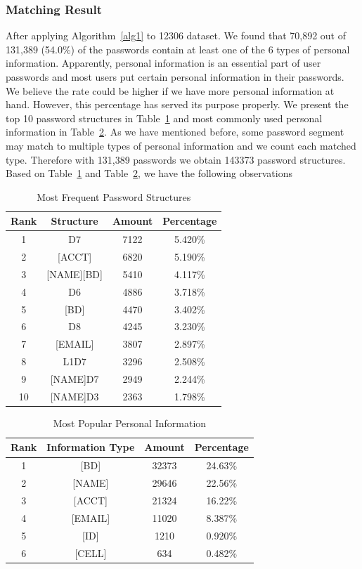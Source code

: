\documentclass{sig-alternate}
\begin{document}
\subsubsection{Matching Result}
\label{matchingresult}
After applying Algorithm~\ref{alg1} to 12306 dataset. We found that 70,892 out of 131,389 (54.0\%) of the passwords contain at least one of the 6 types of personal information. Apparently, personal information is an essential part of user passwords and most users put certain personal information in their passwords. We believe the rate could be higher if we have more personal information at hand. However, this percentage has served its purpose properly. We present the top 10 password structures in Table~\ref{t3} and most commonly used personal information in Table~\ref{t4}. As we have mentioned before, some password segment may match to multiple types of personal information and we count each matched type. Therefore with 131,389 passwords we obtain 143373 password structures. Based on Table~\ref{t3} and Table~\ref{t4}, we have the following observations

\begin{table}
\centering
\caption{Most Frequent Password Structures}
\begin{tabular}{|c|c|c|c|} \hline
Rank&Structure&Amount&Percentage\\ \hline
1&D7&7122&5.420\% \\
2&[ACCT]&6820&5.190\% \\
3&[NAME][BD]&5410&4.117\% \\
4&D6&4886&3.718\% \\
5&[BD]&4470&3.402\% \\
6&D8&4245&3.230\% \\
7&[EMAIL]&3807&2.897\% \\
8&L1D7&3296&2.508\% \\
9&[NAME]D7&2949&2.244\% \\
10&[NAME]D3&2363&1.798\% \\
\hline\end{tabular}
\label{t3}
\end{table}

\begin{table}
\centering
\caption{Most Popular Personal Information}
\begin{tabular}{|c|c|c|c|} \hline
Rank&Information Type&Amount&Percentage\\ \hline
1&[BD]&32373&24.63\%\\
2&[NAME]&29646&22.56\%\\
3&[ACCT]&21324&16.22\%\\
4&[EMAIL]&11020&8.387\%\\
5&[ID]&1210&0.920\%\\
6&[CELL]&634&0.482\%\\
\hline\end{tabular}
\label{t4}
\end{table}
\end{document}
